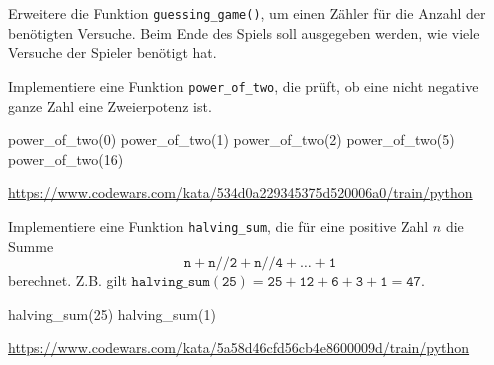\documentclass[class=scrartcl, crop=false]{standalone}
\begin{document}
\begin{aufgabe}
Erweitere die Funktion  \texttt{guessing_game()}, um einen Zähler für die Anzahl der benötigten Versuche. Beim Ende des Spiels soll ausgegeben werden, wie viele Versuche der Spieler benötigt hat.  
\end{aufgabe}

\begin{aufgabe} \noindent
Implementiere eine Funktion \texttt{power_of_two}, die prüft, ob eine nicht negative ganze Zahl eine Zweierpotenz ist. 

\begin{pyconsole}
power_of_two(0)
power_of_two(1)
power_of_two(2)
power_of_two(5)
power_of_two(16)
\end{pyconsole}

\noindent\url{https://www.codewars.com/kata/534d0a229345375d520006a0/train/python}

\end{aufgabe}



\begin{aufgabe} \noindent
Implementiere eine Funktion \texttt{halving_sum}, die für eine positive Zahl $n$ die Summe $$ \mathtt{n + n//2 + n//4 + \dots + 1 } $$ berechnet. Z.B. gilt $\mathtt{halving\_sum(25) = 25 + 12 + 6 + 3 + 1 = 47}$.

\begin{pyconsole}
halving_sum(25)
halving_sum(1)
\end{pyconsole}

\noindent\url{https://www.codewars.com/kata/5a58d46cfd56cb4e8600009d/train/python}

\end{aufgabe}
\end{document}
